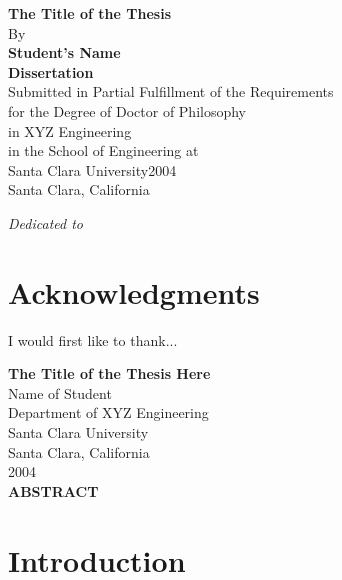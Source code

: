 \documentclass[12pt]{report}
\newcommand{\sixteenpt}{\fontsize{16pt}{19.2pt}\selectfont}
\newcommand{\fourteenpt}{\fontsize{14pt}{16.8pt}\selectfont}
\newcommand{\tenpt}{\fontsize{10pt}{12pt}\selectfont}
\begin{document}
\clearpage
\thispagestyle{plain}
\setcounter{page}{2}

\begin{center}
    \vspace*{1 in}
    {\sixteenpt\textbf{The Title of the Thesis}}\\[1cm]
    
    By\\[1cm]
    
    \textbf{Student's Name}\\[3cm]
    
    \textbf{Dissertation}\\[2cm]
    
    Submitted in Partial Fulfillment of the Requirements\\
    for the Degree of Doctor of Philosophy\\
    in XYZ Engineering\\
    in the School of Engineering at\\
    Santa Clara University\hspace{3mm}2004\\[2cm]
    
    Santa Clara, California
\end{center}


\clearpage
\thispagestyle{plain}
\setcounter{page}{3}

\begin{center}
    \vspace*{1.5in}
    {\fourteenpt\textit{Dedicated to}}
\end{center}


\clearpage

\chapter*{\textbf{Acknowledgments}}
\thispagestyle{plain}
{\tenpt
I would first like to thank...
}

\clearpage
\thispagestyle{plain}
\begin{center}
    {\fourteenpt\textbf{The Title of the Thesis Here}}\\[1cm]
    
    {Name of Student}\\[1cm]
    Department of XYZ Engineering\\
    Santa Clara University\\
    Santa Clara, California\\
    2004\\[1.5cm]
    
    \textbf{ABSTRACT}
\end{center}

\vspace{1cm}


\clearpage
\tableofcontents


\clearpage
{}
\setcounter{page}{1}
\chapter{Introduction}
\end{document}
